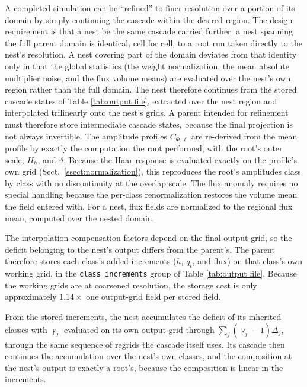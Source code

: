 \documentclass{article}
\begin{document}
A completed simulation can be ``refined'' to finer resolution over a portion of its domain by simply continuing the cascade within the desired region. The design requirement is that a nest be the same cascade carried further: a nest spanning the full parent domain is identical, cell for cell, to a root run taken directly to the nest's resolution. A nest covering part of the domain deviates from that identity only in that the global statistics (the weight normalization, the mean absolute multiplier noise, and the flux volume means) are evaluated over the nest's own region rather than the full domain. The nest therefore continues from the stored cascade states of Table \ref{tab:output file}, extracted over the nest region and interpolated trilinearly onto the nest's grids. A parent intended for refinement must therefore store intermediate cascade states, because the final projection is not always invertible. The
amplitude profiles $C_{\Phi,\ell}$ are re-derived from the mean profile
by exactly the computation the root performed, with the root's outer
scale, $H_h$, and $\vartheta$. Because the Haar response is evaluated
exactly on the profile's own grid (Sect.~\ref{ssect:normalization}), this
reproduces the root's amplitudes class by class with no discontinuity
at the overlap scale. The
flux anomaly requires no special handling because the per-class
renormalization restores the volume mean the field entered with. For a
nest, flux fields are normalized to the regional flux mean, computed over the nested domain.

The interpolation compensation factors depend on the final output grid, so
the deficit belonging to the nest's output differs from the parent's.
The parent therefore stores each class's added increments ($h$, $q_t$,
and flux) on that class's own working grid, in the
\texttt{class\_increments} group of Table \ref{tab:output file}. Because the
working grids are at coarsened resolution, the storage cost is only approximately 
$1.14\times$ one output-grid field per stored field. 

From the stored
increments, the nest accumulates the deficit of its inherited classes
with $\digamma_j$ evaluated on its own output grid through $\sum_j
(\digamma_j - 1) \Delta_j$, through the same sequence of regrids the
cascade itself uses. Its cascade then continues the accumulation over
the nest's own classes, and the composition at the nest's output is
exactly a root's, because the composition is linear in the increments.
\end{document}
